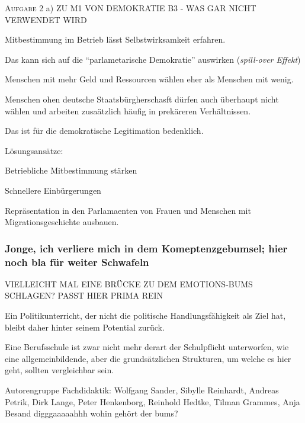 
\textsc{Aufgabe 2} a) \quad
ZU M1 VON DEMOKRATIE B3 - WAS GAR NICHT VERWENDET WIRD
\begin{myitemize}
    \item Mitbestimmung im Betrieb lässt Selbstwirksamkeit erfahren.
    \item Das kann sich auf die \enquote{parlametarische Demokratie} auswirken (\emph{spill-over Effekt})
    \item Menschen mit mehr Geld und Ressourcen wählen eher als Menschen mit wenig.
    \item Menschen ohen deutsche Staatsbürgherschasft dürfen auch überhaupt nicht wählen und arbeiten zusaätzlich häufig in prekäreren Verhältnissen. 
    \item Das ist für die demokratische Legitimation bedenklich.
    \item Lösungsansätze: 
        \begin{myitemize}
            \item Betriebliche Mitbestimmung stärken
            \item Schnellere Einbürgerungen 
            \item Repräsentation in den Parlamaenten von Frauen und Menschen mit Migrationsgeschichte ausbauen.
        \end{myitemize} 
\end{myitemize}


\subsubsection{Jonge, ich verliere mich in dem Komeptenzgebumsel; hier noch bla für weiter Schwafeln}
VIELLEICHT MAL EINE BRÜCKE ZU DEM EMOTIONS-BUMS SCHLAGEN? PASST HIER PRIMA REIN



Ein Politikunterricht, der nicht die politische Handlungsfähigkeit als Ziel hat, bleibt daher hinter seinem Potential zurück.



Eine Berufsschule ist zwar nicht mehr derart der Schulpflicht unterworfen, wie eine allgemeinbildende, aber die grundsätzlichen Strukturen, um welche es hier geht, sollten vergleichbar sein.

 \textcite[467-469]{Nonnenmacher2010}

Autorengruppe Fachdidaktik:
Wolfgang Sander, Sibylle Reinhardt, Andreas Petrik, Dirk Lange, Peter Henkenborg, Reinhold Hedtke, Tilman Grammes, Anja Besand
\autocite[]{Sander.2016}
digggaaaaahhh wohin gehört der bums?\autocite[]{Sander.2016}

